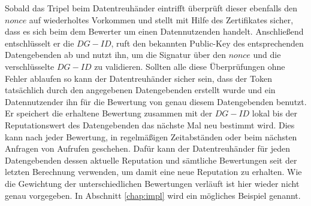 \documentclass[
	fontsize=12pt,
	headings=small,
	parskip=half,           %
	bibliography=totoc,
	numbers=noenddot,       %
	open=any,               %
]{scrreprt}
\begin{document}
Sobald das Tripel beim Datentreuhänder eintrifft überprüft dieser ebenfalls den $nonce$ auf wiederholtes Vorkommen und stellt mit Hilfe des Zertifikates sicher, dass es sich beim dem Bewerter um einen Datennutzenden handelt. Anschließend entschlüsselt er die $DG-ID$, ruft den bekannten Public-Key des entsprechenden Datengebenden ab und nutzt ihn, um die Signatur über den $nonce$ und die verschlüsselte $DG-ID$ zu validieren. Sollten alle diese Überprüfungen ohne Fehler ablaufen so kann der Datentreuhänder sicher sein, dass der Token tatsächlich durch den angegebenen Datengebenden erstellt wurde und ein Datennutzender ihn für die Bewertung von genau diesem Datengebenden benutzt. Er speichert die erhaltene Bewertung zusammen mit der $DG-ID$ lokal bis der Reputationswert des Datengebenden das nächste Mal neu bestimmt wird. Dies kann nach jeder Bewertung, in regelmäßigen Zeitabständen oder beim nächsten Anfragen von Aufrufen geschehen. Dafür kann der Datentreuhänder für jeden Datengebenden dessen aktuelle Reputation und sämtliche Bewertungen seit der letzten Berechnung verwenden, um damit eine neue Reputation zu erhalten. Wie die Gewichtung der unterschiedlichen Bewertungen verläuft ist hier wieder nicht genau vorgegeben. In Abschnitt \ref{chap:impl} wird ein mögliches Beispiel genannt.
\end{document}
